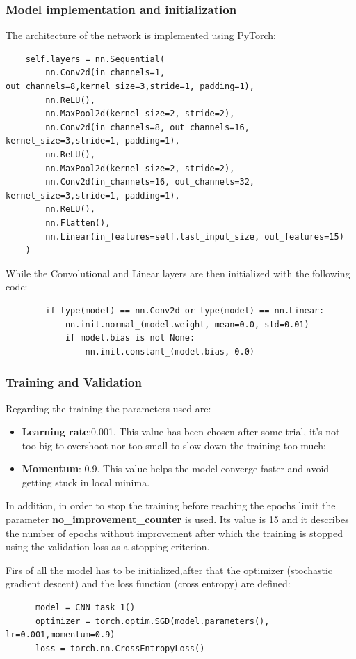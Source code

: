 \documentclass[12pt, a4paper, italian]{scrartcl}
\begin{document}
 \subsubsection{Model implementation and initialization}
 The architecture of the network is implemented using PyTorch:
    \begin{verbatim}
	self.layers = nn.Sequential(
	  	nn.Conv2d(in_channels=1, out_channels=8,kernel_size=3,stride=1, padding=1),
	  	nn.ReLU(),
	  	nn.MaxPool2d(kernel_size=2, stride=2),
	  	nn.Conv2d(in_channels=8, out_channels=16, kernel_size=3,stride=1, padding=1),
	  	nn.ReLU(),
	  	nn.MaxPool2d(kernel_size=2, stride=2),
	  	nn.Conv2d(in_channels=16, out_channels=32, kernel_size=3,stride=1, padding=1),
	  	nn.ReLU(),
	  	nn.Flatten(),
	  	nn.Linear(in_features=self.last_input_size, out_features=15)
	)
\end{verbatim}
While the Convolutional and Linear layers are then initialized with the following code:
    \begin{verbatim}
        if type(model) == nn.Conv2d or type(model) == nn.Linear:
            nn.init.normal_(model.weight, mean=0.0, std=0.01)
            if model.bias is not None:
                nn.init.constant_(model.bias, 0.0)
\end{verbatim}
  \newpage
  \subsubsection{Training and Validation}
  Regarding the training the parameters used are:
  \begin{itemize}
	\item \textbf{Learning rate}:0.001. This value has been chosen after some trial, it's not too big to overshoot nor too small to slow down the training too much;
	\item \textbf{Momentum}: 0.9. This value helps the model converge faster and avoid getting stuck in local minima. 
\end{itemize}
In addition, in order to stop the training before reaching the epochs limit the parameter \textbf{no\_improvement\_counter} is used. Its value is 15 and it describes the number of epochs without improvement after which the training is stopped using the validation loss as a stopping criterion.

  Firs of all the model has to be initialized,after that the optimizer (stochastic gradient descent) and the loss function (cross entropy) are defined:
\begin{verbatim} 
      model = CNN_task_1()
      optimizer = torch.optim.SGD(model.parameters(), lr=0.001,momentum=0.9) 
      loss = torch.nn.CrossEntropyLoss()
\end{verbatim}
\end{document}

